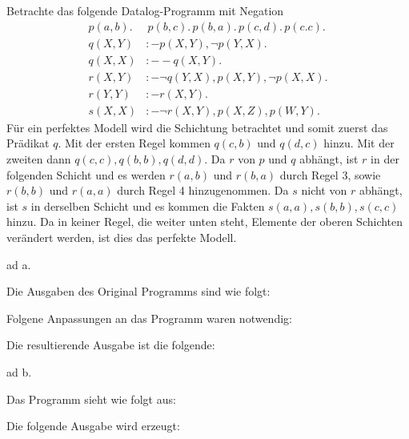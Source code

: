 \documentclass[12pt,a4paper]{amsart}
\begin{document}
\begin{aufgabe1}
Betrachte das folgende Datalog-Programm mit Negation
\begin{equation*}
\begin{split}
 p(a,b).&\,p(b,c).\,p(b,a).\,p(c,d).\,p(c.c).\\
 q(X,Y) &:- p(X,Y),\lnot p(Y,X).\\
 q(X,X) &:- -q(X,Y).\\
 r(X,Y)&:-\lnot q(Y,X),p(X,Y),\lnot p(X,X).\\
 r(Y,Y)&:-r(X,Y).\\
 s(X,X) &:- \lnot r(X,Y),p(X,Z),p(W,Y).
 \end{split}
\end{equation*}
Für ein perfektes Modell wird die Schichtung betrachtet und somit zuerst das Prädikat $q$. Mit der ersten Regel kommen $q(c,b)$ und $q(d,c)$ hinzu. Mit der zweiten dann
$q(c,c),q(b,b),q(d,d)$. Da $r$ von $p$ und $q$ abhängt, ist $r$ in der folgenden Schicht und es werden $r(a,b)$ und $r(b,a)$ durch Regel 3, sowie $r(b,b)$ und $r(a,a)$ durch
Regel 4 hinzugenommen. Da $s$ nicht von $r$ abhängt, ist $s$ in derselben Schicht und es kommen die Fakten $s(a,a), s(b,b),s(c,c)$ hinzu. Da in keiner Regel, die weiter unten
steht, Elemente der oberen Schichten verändert werden, ist dies das perfekte Modell.
\end{aufgabe1}

\begin{aufgabe1}
ad a.

Die Ausgaben des Original Programms sind wie folgt:


Folgene Anpassungen an das Programm waren notwendig:


Die resultierende Ausgabe ist die folgende:


\medskip

ad b.

Das Programm sieht wie folgt aus:


Die folgende Ausgabe wird erzeugt:


\end{aufgabe1}
\end{document}
